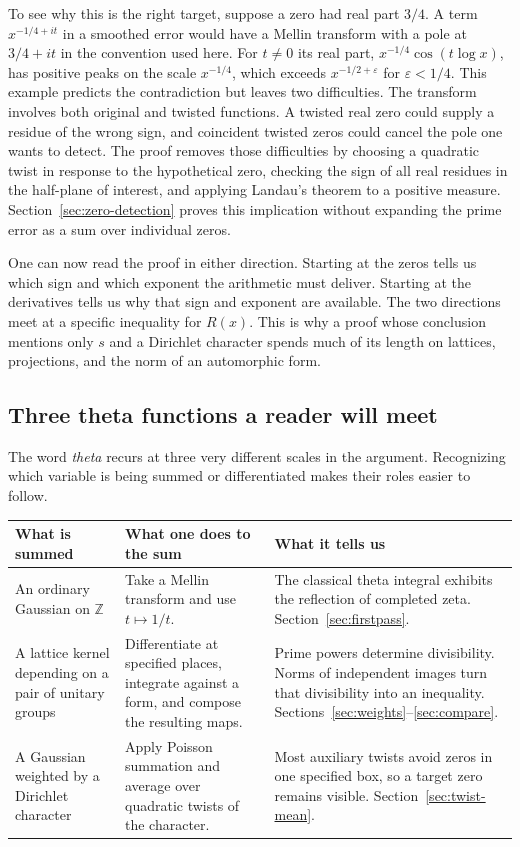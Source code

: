 \documentclass[11pt,letterpaper]{article}
\begin{document}
To see why this is the right target, suppose a zero had real part \(3/4\). A term \(x^{-1/4+it}\) in a smoothed error would have a Mellin transform with a pole at \(3/4+it\) in the convention used here. For \(t\ne0\) its real part, \(x^{-1/4}\cos(t\log x)\), has positive peaks on the scale \(x^{-1/4}\), which exceeds \(x^{-1/2+\varepsilon}\) for \(\varepsilon<1/4\). This example predicts the contradiction but leaves two difficulties. The transform involves both original and twisted functions. A twisted real zero could supply a residue of the wrong sign, and coincident twisted zeros could cancel the pole one wants to detect. The proof removes those difficulties by choosing a quadratic twist in response to the hypothetical zero, checking the sign of all real residues in the half-plane of interest, and applying Landau's theorem to a positive measure. Section~\ref{sec:zero-detection} proves this implication without expanding the prime error as a sum over individual zeros.

One can now read the proof in either direction. Starting at the zeros tells us which sign and which exponent the arithmetic must deliver. Starting at the derivatives tells us why that sign and exponent are available. The two directions meet at a specific inequality for \(R(x)\). This is why a proof whose conclusion mentions only \(s\) and a Dirichlet character spends much of its length on lattices, projections, and the norm of an automorphic form.


\subsection*{Three theta functions a reader will meet}

The word \emph{theta} recurs at three very different scales in the argument. Recognizing which variable is being summed or differentiated makes their roles easier to follow.

\begin{center}\renewcommand{\arraystretch}{1.30}
\begin{tabularx}{\linewidth}{@{}>{\raggedright\arraybackslash}p{.24\linewidth}XX@{}}
\toprule
\textbf{What is summed} & \textbf{What one does to the sum} & \textbf{What it tells us}\\\midrule
An ordinary Gaussian on \(\mathbb Z\) &
Take a Mellin transform and use \(t\mapsto1/t\). &
The classical theta integral exhibits the reflection of completed zeta. Section~\ref{sec:firstpass}.\\
A lattice kernel depending on a pair of unitary groups &
Differentiate at specified places, integrate against a form, and compose the resulting maps. &
Prime powers determine divisibility. Norms of independent images turn that divisibility into an inequality. Sections~\ref{sec:weights}--\ref{sec:compare}.\\
A Gaussian weighted by a Dirichlet character &
Apply Poisson summation and average over quadratic twists of the character. &
Most auxiliary twists avoid zeros in one specified box, so a target zero remains visible. Section~\ref{sec:twist-mean}.\\\bottomrule
\end{tabularx}
\end{center}
\end{document}
